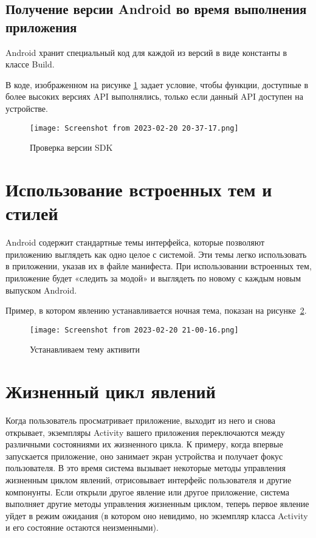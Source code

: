 \subsection{Получение версии Android во время выполнения приложения}
Android хранит специальный код для каждой из версий в виде константы в
классе Build.\par
В коде, изображенном на рисунке \ref{fig:code:vsdk} задает условие,
чтобы функции, доступные в более высоких версиях API выполнялись,
только если данный API доступен на устройстве.
\begin{figure}[h!tp]
	\centering
	\texttt{[image: Screenshot from 2023-02-20 20-37-17.png]}
	\caption{Проверка версии SDK}
	\label{fig:code:vsdk}
\end{figure}

\section{Использование встроенных тем и стилей}
Android содержит стандартные темы интерфейса, которые позволяют
приложению выглядеть как одно целое с системой. Эти темы легко
использовать в приложении, указав их в файле манифеста. При
использовании встроенных тем, приложение будет «следить за модой» и
выглядеть по новому с каждым новым выпуском Android.\par
Пример, в котором явлению устанавливается ночная тема,
показан на рисунке~\ref{fig:manifest:theme}.
\begin{figure}[h!tp]
	\centering
	\texttt{[image: Screenshot from 2023-02-20 21-00-16.png]}
	\caption{Устанавливаем тему активити}
	\label{fig:manifest:theme}
\end{figure}

\section{Жизненный цикл явлений}
Когда пользователь просматривает приложение, выходит из него и снова
открывает, экземпляры Activity вашего приложения переключаются между
различными состояниями их жизненного цикла. К примеру, когда впервые
запускается приложение, оно занимает экран устройства и получает фокус
пользователя. В это время система вызывает некоторые методы управления
жизненным циклом явлений, отрисовывает интерфейс пользователя и другие
компонунты. Если открыли другое явление или другое приложение, система
выполняет другие методы управления жизненным циклом, теперь первое явление
уйдет в режим ожидания (в котором оно невидимо, но экземпляр класса
Activity и его состояние остаются неизменными).

